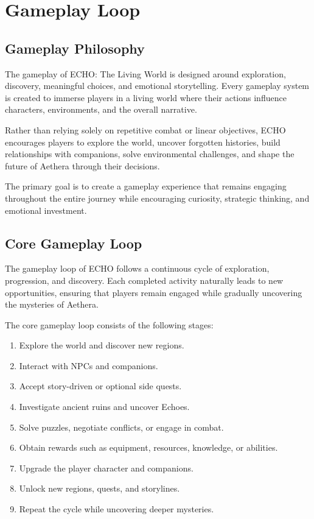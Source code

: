 \chapter{Gameplay Loop}

\section{Gameplay Philosophy}

The gameplay of ECHO: The Living World is designed around exploration, discovery, meaningful choices, and emotional storytelling. Every gameplay system is created to immerse players in a living world where their actions influence characters, environments, and the overall narrative.

Rather than relying solely on repetitive combat or linear objectives, ECHO encourages players to explore the world, uncover forgotten histories, build relationships with companions, solve environmental challenges, and shape the future of Aethera through their decisions.

The primary goal is to create a gameplay experience that remains engaging throughout the entire journey while encouraging curiosity, strategic thinking, and emotional investment.

\section{Core Gameplay Loop}

The gameplay loop of ECHO follows a continuous cycle of exploration, progression, and discovery. Each completed activity naturally leads to new opportunities, ensuring that players remain engaged while gradually uncovering the mysteries of Aethera.

The core gameplay loop consists of the following stages:

\begin{enumerate}
    \item Explore the world and discover new regions.
    \item Interact with NPCs and companions.
    \item Accept story-driven or optional side quests.
    \item Investigate ancient ruins and uncover Echoes.
    \item Solve puzzles, negotiate conflicts, or engage in combat.
    \item Obtain rewards such as equipment, resources, knowledge, or abilities.
    \item Upgrade the player character and companions.
    \item Unlock new regions, quests, and storylines.
    \item Repeat the cycle while uncovering deeper mysteries.
\end{enumerate}

